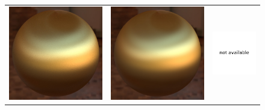\begin{figure}[t]
	\addtolength{\tabcolsep}{-3pt}
	\begin{tabular}{ccc}
		\includegraphics[width=0.315\columnwidth]{img/validations/compare2/aniso_comb_hor_hor_512spp_17min.jpg} &
		\includegraphics[width=0.315\columnwidth]{img/validations/compare2/aniso_comb_hor_hor_wenzel.jpg} &
		\includegraphics[width=0.315\columnwidth]{img/validations/compare2/na.pdf} \\
		

\end{tabular}
\end{figure}
